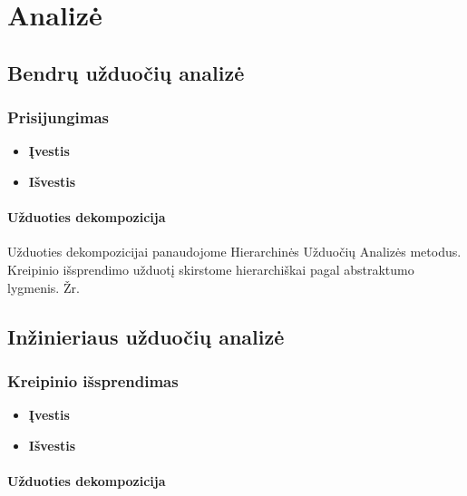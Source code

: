 \section{Analizė}

\subsection{Bendrų užduočių analizė}

	\subsubsection{Prisijungimas}
	
		\begin{itemize}
			\item \textbf{Įvestis}
			\item \textbf{Išvestis} 
		\end{itemize}
		
		
	\paragraph{Užduoties dekompozicija}
	
	
	Užduoties dekompozicijai panaudojome Hierarchinės Užduočių Analizės metodus.
	Kreipinio išsprendimo užduotį skirstome hierarchiškai pagal abstraktumo lygmenis. 
	Žr. 

\subsection{Inžinieriaus užduočių analizė}
	
	\subsubsection{Kreipinio išsprendimas}
	
		\begin{itemize}
			\item \textbf{Įvestis}
			\item \textbf{Išvestis} 
		\end{itemize}
		
		
	\paragraph{Užduoties dekompozicija}
	
